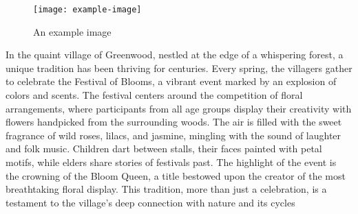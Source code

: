 \documentclass{article}
\begin{document}
\begin{wrapfigure}{R}{0.5\textwidth}
    \texttt{[image: example-image]}
    \caption{An example image}
\end{wrapfigure}

In the quaint village of Greenwood, nestled at the edge of a whispering forest,
a unique tradition has been thriving for centuries. Every spring, the villagers
gather to celebrate the Festival of Blooms, a vibrant event marked by an
explosion of colors and scents. The festival centers around the competition of
floral arrangements, where participants from all age groups display their
creativity with flowers handpicked from the surrounding woods. The air is filled
with the sweet fragrance of wild roses, lilacs, and jasmine, mingling with the
sound of laughter and folk music. Children dart between stalls, their faces
painted with petal motifs, while elders share stories of festivals past. The
highlight of the event is the crowning of the Bloom Queen, a title bestowed upon
the creator of the most breathtaking floral display. This tradition, more than
just a celebration, is a testament to the village's deep connection with nature
and its cycles
\end{document}
